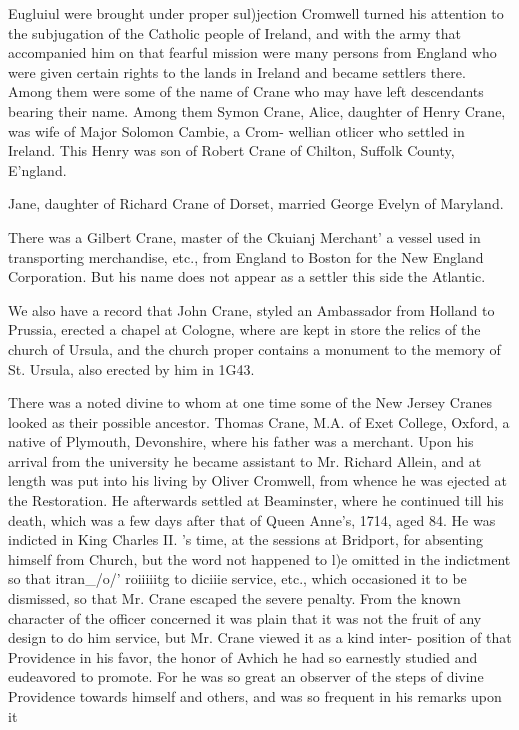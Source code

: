 \documentclass{book}
\begin{document}
Eugluiul were brought under proper sul)jection Cromwell turned 
his attention to the subjugation of the Catholic people of Ireland, 
and with the army that accompanied him on that fearful mission 
were many persons from England who were given certain rights 
to the lands in Ireland and became settlers there. Among them 
were some of the name of Crane who may have left descendants 
bearing their name. Among them Symon Crane, Alice, daughter 
of Henry Crane, was wife of Major Solomon Cambie, a Crom- 
wellian otlicer who settled in Ireland. This Henry was son of 
Robert Crane of Chilton, Suffolk County, E'ngland. 

Jane, daughter of Richard Crane of Dorset, married George 
Evelyn of Maryland. 

There was a Gilbert Crane, master of the Ckuianj Merchant' 
a vessel used in transporting merchandise, etc., from England to 
Boston for the New England Corporation. But his name does 
not appear as a settler this side the Atlantic. 

We also have a record that John Crane, styled an Ambassador 
from Holland to Prussia, erected a chapel at Cologne, where are 
kept in store the relics of the church of Ursula, and the church 
proper contains a monument to the memory of St. Ursula, also 
erected by him in 1G43. 

There was a noted divine to whom at one time some of the 
New Jersey Cranes looked as their possible ancestor. Thomas 
Crane, M.A. of Exet College, Oxford, a native of Plymouth, 
Devonshire, where his father was a merchant. Upon his arrival 
from the university he became assistant to Mr. Richard Allein, 
and at length was put into his living by Oliver Cromwell, from 
whence he was ejected at the Restoration. He afterwards settled 
at Beaminster, where he continued till his death, which was a few 
days after that of Queen Anne's, 1714, aged 84. He was 
indicted in King Charles II. 's time, at the sessions at Bridport, 
for absenting himself from Church, but the word not happened to 
l)e omitted in the indictment so that itran\_/o/' roiiiiitg to diciiie 
service, etc., which occasioned it to be dismissed, so that Mr. 
Crane escaped the severe penalty. From the known character of 
the officer concerned it was plain that it was not the fruit of any 
design to do him service, but Mr. Crane viewed it as a kind inter- 
position of that Providence in his favor, the honor of Avhich he 
had so earnestly studied and eudeavored to promote. For he 
was so great an observer of the steps of divine Providence towards 
himself and others, and was so frequent in his remarks upon it 
\end{document}
